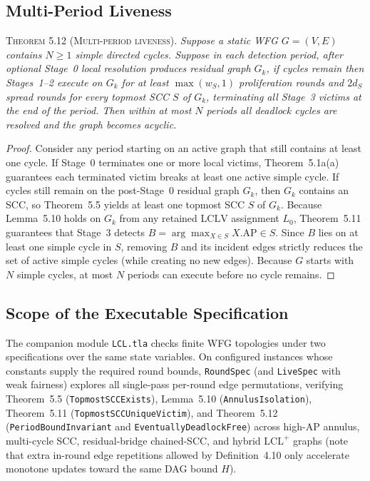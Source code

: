 \documentclass[sigconf,nonacm]{acmart}
\newcommand{\lclv}{\mathrm{LCLV}}
\newcommand{\ap}{\mathrm{AP}}
\newcommand{\phead}[1]{\par\noindent\textsc{#1.}\enspace}
\begin{document}
\subsection{Multi-Period Liveness}
\label{sec:liveness}
\phead{Theorem 5.12 (Multi-period liveness)}%
\emph{Suppose a static WFG \(G=(V,E)\) contains \(N\ge 1\) simple
directed cycles. Suppose in each detection period, after optional
Stage~0 local resolution produces residual graph \(G_k\), if cycles
remain then Stages~1--2 execute on \(G_k\) for at least \(\max(w_S,1)\)
proliferation rounds and \(2d_S\) spread rounds for every topmost SCC
\(S\) of \(G_k\), terminating all Stage~3 victims at the end of the
period. Then within at most \(N\) periods all deadlock cycles are
resolved and the graph becomes acyclic.}

\begin{proof}
Consider any period starting on an active graph that still contains at
least one cycle. If Stage~0 terminates one or more local victims,
Theorem~5.1a(a) guarantees each terminated victim breaks at least one
active simple cycle. If cycles still remain on the post-Stage~0 residual
graph \(G_k\), then \(G_k\) contains an SCC, so Theorem~5.5 yields at
least one topmost SCC \(S\) of \(G_k\). Because Lemma~5.10 holds on
\(G_k\) from any retained \(\lclv\) assignment \(L_0\), Theorem~5.11
guarantees that Stage~3 detects \(B=\arg\max_{X\in S} X.\ap\in S\).
Since \(B\) lies on at least one simple cycle in \(S\), removing \(B\)
and its incident edges strictly reduces the set of active simple cycles
(while creating no new edges). Because \(G\) starts with \(N\) simple
cycles, at most \(N\) periods can execute before no cycle remains.
\end{proof}

\balance
\subsection{Scope of the Executable Specification}
\label{sec:model}
\begingroup\sloppy
The companion module \texttt{LCL.tla} checks finite WFG topologies under
two specifications over the same state variables.
On configured instances whose constants supply the required round bounds,
\texttt{RoundSpec} (and \texttt{LiveSpec} with weak fairness) explores
all single-pass per-round edge permutations, verifying Theorem~5.5
(\texttt{TopmostSCCExists}), Lemma~5.10 (\texttt{AnnulusIsolation}),
Theorem~5.11 (\texttt{TopmostSCCUniqueVictim}), and Theorem~5.12
(\texttt{PeriodBoundInvariant} and \texttt{EventuallyDeadlockFree})
across high-\(\ap\) annulus, multi-cycle SCC, residual-bridge
chained-SCC, and hybrid \(\text{LCL}^+\) graphs (note that extra
in-round edge repetitions allowed by Definition~4.10 only accelerate
monotone updates toward the same DAG bound \(H\)).
\end{document}
